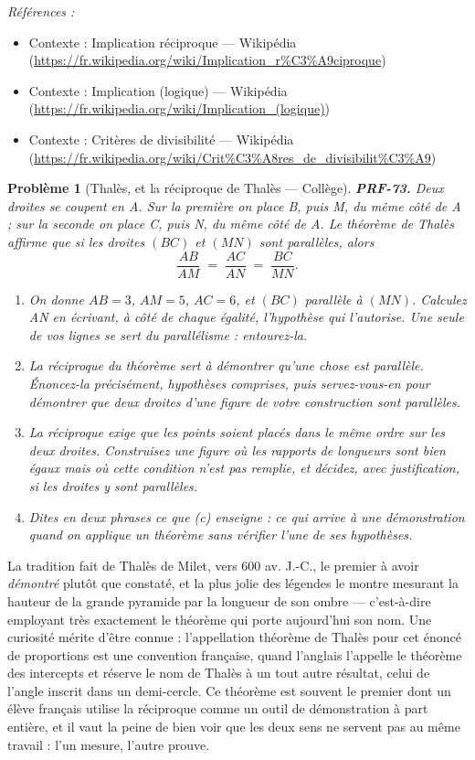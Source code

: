 \documentclass[11pt]{article}
\newtheorem{problem}{Problème}
\newenvironment{refs}{\par\small\noindent\emph{Références :}\begin{itemize}\setlength\itemsep{0pt}}{\end{itemize}\normalsize}
\begin{document}
\begin{refs}
\item Contexte : Implication réciproque --- Wikipédia (\url{https://fr.wikipedia.org/wiki/Implication_r%C3%A9ciproque})
\item Contexte : Implication (logique) --- Wikipédia (\url{https://fr.wikipedia.org/wiki/Implication_(logique)})
\item Contexte : Critères de divisibilité --- Wikipédia (\url{https://fr.wikipedia.org/wiki/Crit%C3%A8res_de_divisibilit%C3%A9})
\end{refs}

\bigskip

\begin{problem}[{Thalès, et la réciproque de Thalès --- Collège}]
\textbf{PRF-73.} Deux droites se coupent en A. Sur la première on place B, puis M, du même
côté de A ; sur la seconde on place C, puis N, du même côté de A. Le théorème de Thalès
affirme que si les droites $ (BC) $ et $ (MN) $ sont parallèles, alors
\[ \frac{AB}{AM} \;=\; \frac{AC}{AN} \;=\; \frac{BC}{MN}. \]
\begin{enumerate}
\item[(a)] On donne $ AB = 3 $, $ AM = 5 $, $ AC = 6 $, et $ (BC) $ parallèle à
$ (MN) $. Calculez AN en écrivant, à côté de chaque égalité, l'hypothèse qui l'autorise.
Une seule de vos lignes se sert du parallélisme : entourez-la.
\item[(b)] La réciproque du théorème sert à démontrer qu'une chose est parallèle. Énoncez-la
précisément, hypothèses comprises, puis servez-vous-en pour démontrer que deux droites d'une
figure de votre construction sont parallèles.
\item[(c)] La réciproque exige que les points soient placés \og{} dans le même ordre \fg{} sur les deux
droites. Construisez une figure où les rapports de longueurs sont bien égaux mais où cette
condition n'est pas remplie, et décidez, avec justification, si les droites y sont
parallèles.
\item[(d)] Dites en deux phrases ce que (c) enseigne : ce qui arrive à une démonstration quand on
applique un théorème sans vérifier l'une de ses hypothèses.
\end{enumerate}

\end{problem}

\noindent La tradition fait de Thalès de Milet, vers 600 av. J.-C., le premier
à avoir \textit{démontré} plutôt que constaté, et la plus jolie des légendes le montre mesurant
la hauteur de la grande pyramide par la longueur de son ombre --- c'est-à-dire employant très
exactement le théorème qui porte aujourd'hui son nom. Une curiosité mérite d'être connue :
l'appellation \og{} théorème de Thalès \fg{} pour cet énoncé de proportions est une convention
française, quand l'anglais l'appelle le théorème des intercepts et réserve le nom de Thalès
à un tout autre résultat, celui de l'angle inscrit dans un demi-cercle. Ce théorème est
souvent le premier dont un élève français utilise la réciproque comme un outil de
démonstration à part entière, et il vaut la peine de bien voir que les deux sens ne servent
pas au même travail : l'un mesure, l'autre prouve.
\end{document}
